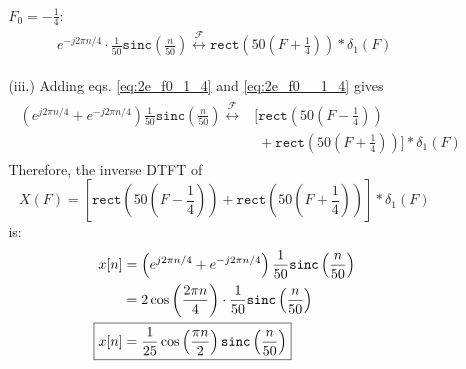 \documentclass[a4paper, 12pt]{article}
\begin{document}
\begin{itemize}
\begin{itemize}
\begin{itemize}
\begin{equation}
\begin{gathered}
\begin{alignedat}{1}
\end{alignedat}
\end{gathered}
\label{eq:2e_f0_1_4}
\end{equation} \\
$F_{0} = -\frac{1}{4}$:
\begin{equation}
\begin{gathered}
\begin{alignedat}{1}
e^{-j2\pi n/4} \cdot \frac{1}{50} \mathtt{sinc} \left(\frac{n}{50} \right) \overset{\mathcal{F}}{\leftrightarrow} \mathtt{rect}\left(50\left(F + \frac{1}{4}\right)\right)*\delta_{1}(F)
\end{alignedat}
\end{gathered}
\label{eq:2e_f0__1_4}
\end{equation}
\item[(iii.)]{Adding eqs. \eqref{eq:2e_f0_1_4} and \eqref{eq:2e_f0__1_4} gives}
\begin{equation}
\begin{gathered}
\begin{alignedat}{1}
\left(e^{j2\pi n/4} +  e^{-j2\pi n/4}\right) \frac{1}{50} \mathtt{sinc} \left(\frac{n}{50} \right) \overset{\mathcal{F}}{\leftrightarrow} &\Biggr[\mathtt{rect}\left(50\left(F - \frac{1}{4}\right)\right) \\
&\;+ \mathtt{rect}\left(50\left(F + \frac{1}{4}\right)\right) \Biggr]*\delta_{1}(F)
\end{alignedat}
\end{gathered}
\end{equation}
Therefore, the inverse DTFT of
\begin{equation}
X(F) = \left[\mathtt{rect}\left(50\left(F - \frac{1}{4}\right)\right) + \mathtt{rect}\left(50\left(F + \frac{1}{4}\right)\right) \right]*\delta_{1}(F)
\end{equation}
is:
\begin{equation}
\begin{gathered}
\begin{alignedat}{1}
x[n] &= \left(e^{j2\pi n/4} +  e^{-j2\pi n/4}\right) \frac{1}{50} \mathtt{sinc} \left(\frac{n}{50} \right) \\
&= 2 \cos \left(\frac{2\pi n}{4} \right) \cdot \frac{1}{50} \mathtt{sinc} \left(\frac{n}{50} \right) \\
\Aboxed{x[n] & = \frac{1}{25} \cos \left(\frac{\pi n}{2} \right)  \mathtt{sinc} \left(\frac{n}{50} \right)}
\end{alignedat}
\end{gathered}
\end{equation}


\end{itemize}
\end{itemize}
\end{itemize}
\end{document}
